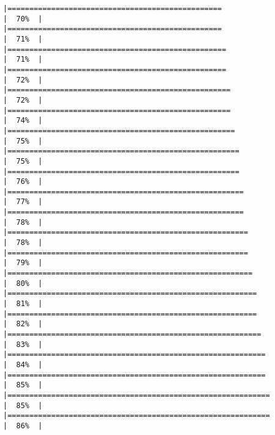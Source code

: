 \documentclass[
]{article}
\begin{document}
\begin{verbatim}
|=================================================                     |  70%  |                                                                              |=================================================                     |  71%  |                                                                              |==================================================                    |  71%  |                                                                              |==================================================                    |  72%  |                                                                              |===================================================                   |  72%  |                                                                              |===================================================                   |  74%  |                                                                              |====================================================                  |  75%  |                                                                              |=====================================================                 |  75%  |                                                                              |=====================================================                 |  76%  |                                                                              |======================================================                |  77%  |                                                                              |======================================================                |  78%  |                                                                              |=======================================================               |  78%  |                                                                              |=======================================================               |  79%  |                                                                              |========================================================              |  80%  |                                                                              |=========================================================             |  81%  |                                                                              |=========================================================             |  82%  |                                                                              |==========================================================            |  83%  |                                                                              |===========================================================           |  84%  |                                                                              |===========================================================           |  85%  |                                                                              |============================================================          |  85%  |                                                                              |============================================================          |  86%  |                                                                              
\end{verbatim}
\end{document}

